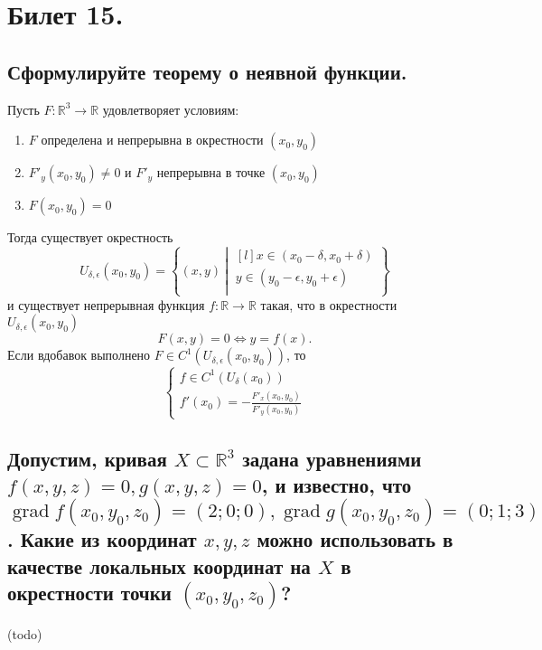 \section{Билет 15.}

\subsection{Сформулируйте теорему о неявной функции.}
\begin{theorem}
    Пусть $F : \mathbb{R}^3 \to \mathbb{R}$ удовлетворяет условиям:
    \begin{enumerate}
        \item $F$ определена и непрерывна в окрестности $(x_0, y_0)$
        \item $F'_y(x_0, y_0) \neq 0$ и  $F'_y$ непрерывна в точке $(x_0, y_0)$
        \item $F(x_0, y_0) = 0$
    \end{enumerate}
    Тогда существует окрестность
    \[
        U_{\delta, \epsilon}(x_0, y_0) = \left\{
            (x,y) \> \left|
                \>
                \begin{matrix}[l]
                    x \in (x_0 - \delta, x_0 + \delta) \\
                    y \in (y_0 - \epsilon, y_0 + \epsilon) \\
                \end{matrix}
            \right.
        \right\}
    \]
    и существует непрерывная функция $f : \mathbb{R} \to \mathbb{R}$ такая, что в окрестности $U_{\delta, \epsilon}(x_0, y_0)$
    \[
        F(x,y) = 0 \Leftrightarrow y = f(x).
    \]
    Если вдобавок выполнено $F \in C^1(U_{\delta, \epsilon}(x_0, y_0))$, то
    \[
        \begin{cases}
            f \in C^1(U_{\delta}(x_0)) \\
            f'(x_0) = - \frac{F'_x(x_0, y_0)}{F'_y(x_0, y_0)}
        \end{cases}
    \]
\end{theorem}

\subsection{Допустим, кривая $X \subset \mathbb{R}^3$ задана уравнениями $f(x,y,z) = 0, g(x,y,z) = 0$, и известно, что $\operatorname{grad} f(x_0, y_0, z_0) = (2;0;0), \operatorname{grad} g(x_0, y_0, z_0) = (0;1;3)$. Какие из координат $x,y,z$ можно использовать в качестве локальных координат на $X$ в окрестности точки $(x_0, y_0, z_0)$?}
(todo) 